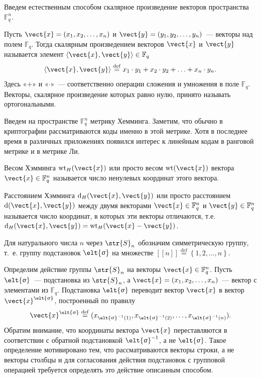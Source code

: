 \documentclass[12pt]{extarticle}
\begin{document}
Введем естественным способом скалярное произведение векторов пространства \(\mathbb{F}^n_q\).

Пусть \(\vect{x}=(x_1,x_2,\ldots, x_n)\) и \(\vect{y}=(y_1,y_2,\ldots,y_n)\)~--- векторы над полем \(\mathbb{F}_q\).
Тогда скалярным произведением векторов \(\vect{x}\) и \(\vect{y}\) называется элемент \(\left\langle \vect{x}, \vect{y} \right\rangle\in \mathbb{F}_q\)
\[
\left\langle\vect{x}, \vect{y}\right\rangle
\stackrel{\mathrm{def}}{=} x_1\cdot y_1 + x_2\cdot y_2 + \ldots + x_n\cdot y_n.
\]
Здесь «\(+\)» и «\(\cdot\)»~--- соответственно операции сложения и умножения в поле \(\mathbb{F}_q\).
Векторы, скалярное произведение которых равно нулю, принято называть ортогональными.

Введем на пространстве \(\mathbb{F}^n_q\) метрику Хемминга.
Заметим, что обычно в криптографии рассматриваются коды именно в этой метрике.
Хотя в последнее время в различных приложениях появился интерес к линейным кодам в ранговой метрике и в метрике Ли.

Весом Хэмминга \(\operatorname{wt}_H(\vect{x})\) или просто весом \(\operatorname{wt}(\vect{x})\) вектора \(\vect{x}\in \mathbb{F}^n_q\) называется число ненулевых координат этого вектора.

Расстоянием Хэмминга \(\operatorname{d}_H(\vect{x},\vect{y})\) или просто расстоянием \(\operatorname{d}(\vect{x},\vect{y})\) между двумя векторами \(\vect{x}\in \mathbb{F}^n_q\) и \(\vect{y}\in \mathbb{F}^n_q\) называется число координат, в которых эти векторы отличаются, т.е. \(\operatorname{d}_H(\vect{x},\vect{y})=\operatorname{wt}_H(\vect{x}-\vect{y})\).

Для натурального числа \(n\) через \(\str{S}_{n}\) обозначим симметрическую группу, т.~е. группу подстановок \(\elt{\sigma}\) на множестве \([\![n]\!] \stackrel{\mathrm{def}}{=} \left\{1,2, \dotsc, n\right\}\).

Определим действие группы \(\str{S}_{n}\) на векторы \(\vect{x}\in \mathbb{F}^{n}_{q}\).
Пусть \(\elt{\sigma}\)~--- подстановка из \(\str{S}_{n}\), а \(\vect{x}=(x_1,x_2,\ldots,x_n)\)~--- вектор с элементами из \(\mathbb{F}_q\).
Подстановка \(\elt{\sigma}\) переводит вектор \(\vect{x}\) в вектор \(\vect{x}^{\elt{\sigma}}\), построенный по правилу
\[\vect{x}^{\elt{\sigma}}\stackrel{\mathrm{def}}{=}(x_{\elt{\sigma}^{-1}(1)},x_{\elt{\sigma}^{-1}(2)},\ldots,x_{\elt{\sigma}^{-1}(n)}).\]
Обратим внимание, что координаты вектора \(\vect{x}\) переставляются в соответствии с обратной подстановкой \(\elt{\sigma}^{-1}\), а не \(\elt{\sigma}\).
Такое определение мотивировано тем, что рассматриваются векторы строки, а не векторы столбцы и для согласования действия подстановок с групповой операцией требуется определять это действие описанным способом.
\end{document}
